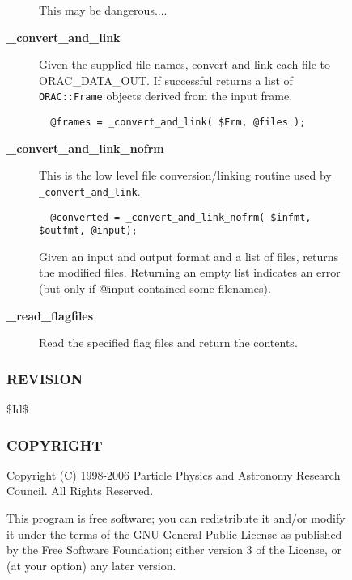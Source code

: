 \begin{description}
\begin{description}
\begin{description}
This may be dangerous....


\item[{\textbf{\_convert\_and\_link}}] \mbox{}

Given the supplied file names, convert and link each file to ORAC\_DATA\_OUT.
If successful returns a list of \texttt{ORAC::Frame} objects derived from the input frame.

\begin{verbatim}
  @frames = _convert_and_link( $Frm, @files );
\end{verbatim}

\item[{\textbf{\_convert\_and\_link\_nofrm}}] \mbox{}

This is the low level file conversion/linking routine used by
\texttt{\_convert\_and\_link}.

\begin{verbatim}
  @converted = _convert_and_link_nofrm( $infmt, $outfmt, @input);
\end{verbatim}


Given an input and output format and a list of files, returns
the modified files. Returning an empty list indicates an error (but
only if @input contained some filenames).


\item[{\textbf{\_read\_flagfiles}}] \mbox{}

Read the specified flag files and return the contents.

\end{description}
\subsubsection*{REVISION\label{ORAC::Loop_REVISION}}


\$Id\$

\subsubsection*{COPYRIGHT\label{ORAC::Loop_COPYRIGHT}}


Copyright (C) 1998-2006 Particle Physics and Astronomy Research
Council. All Rights Reserved.



This program is free software; you can redistribute it and/or modify it under
the terms of the GNU General Public License as published by the Free Software
Foundation; either version 3 of the License, or (at your option) any later
version.




\end{description}
\end{description}
